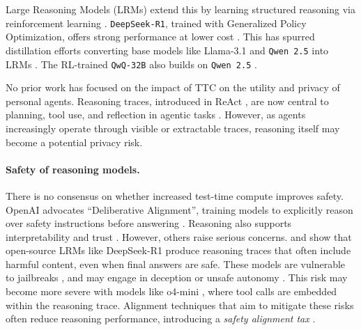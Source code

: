 Large Reasoning Models (LRMs) extend this by learning structured reasoning via reinforcement learning \citep{xu2025towards,jiaqi2025o1tor1}. \texttt{DeepSeek-R1}, trained with Generalized Policy Optimization, offers strong performance at lower cost \citep{deepseekai2025deepseekr1}. This has spurred distillation efforts converting base models like Llama-3.1 and \texttt{Qwen 2.5} into LRMs \citep{grattafiori2024llama, qwen2025qwen25, muennighoff2025s1}. The RL-trained \texttt{QwQ-32B} also builds on \texttt{Qwen 2.5} \citep{qwq32b}.

No prior work has focused on the impact of TTC on the utility and privacy of personal agents.
Reasoning traces, introduced in ReAct \citep{yao2023react}, are now central to planning, tool use, and reflection in agentic tasks \citep{zhou2025large}. However, as agents increasingly operate through visible or extractable traces, reasoning itself  may become a potential privacy risk.



\paragraph{Safety of reasoning models.} 

There is no consensus on whether increased test-time compute improves safety. OpenAI advocates ``Deliberative Alignment'', training models to explicitly reason over safety instructions before answering \citep{zhou2024deliberative}. Reasoning also supports interpretability and trust \citep{wei-jie-etal-2024-interpretable,huang2025trusttrustenhancinglarge}. However, others raise serious concerns. \citet{wang2025safetylargereasoningmodels} and \citet{zhou2025hiddenriskslargereasoning} show that open-source LRMs like DeepSeek-R1 produce reasoning traces that often include harmful content, even when final answers are safe. These models are vulnerable to jailbreaks \citep{li2025smarterllmssaferexploring,jiang2025safechain}, and may engage in deception or unsafe autonomy \citep{baker2025monitoringreasoningmodelsmisbehavior,chen_reasoning_2025}. 
This risk may become more severe with models like o4-mini \cite{o4mini2025}, where tool calls are embedded within the reasoning trace.
Alignment techniques that aim to mitigate these risks often reduce reasoning performance, introducing a \textit{safety alignment tax} \citep{huang2025safetytaxsafetyalignment}. 
